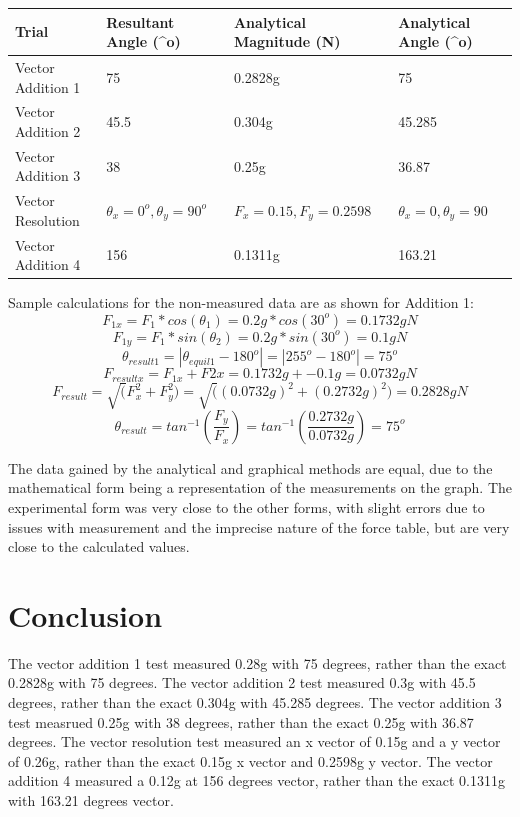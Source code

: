 \documentclass[11pt, titlepage]{article}
\begin{document}
\begin{center}
\begin{tabular}
{|m{7em}|m{7em}|m{7em}|m{7em}|}
\hline
Trial & Resultant Angle (^o) & Analytical Magnitude (N) & Analytical Angle (^o) \\ 
\hline
Vector Addition 1 & 75 & 0.2828g & 75 \\
\hline
Vector Addition 2 & 45.5 & 0.304g & 45.285 \\
\hline
Vector Addition 3 & 38 & 0.25g & 36.87 \\
\hline
Vector Resolution & $\theta_x = 0^o, \theta_y = 90^o$ & $F_x = 0.15, F_y = 0.2598$ & $\theta_x = 0, \theta_y = 90$ \\
\hline
Vector Addition 4 & 156 & 0.1311g & 163.21 \\
\hline
\end{tabular}
\end{center}

Sample calculations for the non-measured data are as shown for Addition 1:
$$F_{1x} = F_1*cos(\theta_1) = 0.2g*cos(30^o) = 0.1732g N$$
$$F_{1y} = F_1*sin(\theta_2) = 0.2g*sin(30^o) = 0.1g N$$
$$\theta_{result1} = |\theta_{equil1} - 180^o| = |255^o - 180^o| = 75^o$$
$$F_{resultx} = F_{1x} + F{2x} = 0.1732g + -0.1g = 0.0732g N$$
$$F_{result} = \sqrt(F_x^2 + F_y^2) = \sqrt((0.0732g)^2 + (0.2732g)^2) = 0.2828g N$$
$$\theta_{result} = tan^{-1}(\frac{F_y}{F_x}) = tan^{-1}(\frac{0.2732g}{0.0732g}) = 75^o$$

The data gained by the analytical and graphical methods are equal, due to the mathematical form being a representation of the measurements on the graph. The experimental form was very close to the other forms, with slight errors due to issues with measurement and the imprecise nature of the force table, but are very close to the calculated values.

\section*{Conclusion}
The vector addition 1 test measured 0.28g with 75 degrees, rather than the exact 0.2828g with 75 degrees. The vector addition 2 test measured 0.3g with 45.5 degrees, rather than the exact 0.304g with 45.285 degrees. The vector addition 3 test measrued 0.25g with 38 degrees, rather than the exact 0.25g with 36.87 degrees. The vector resolution test measured an x vector of 0.15g and a y vector of 0.26g, rather than the exact 0.15g x vector and 0.2598g y vector. The vector addition 4 measured a 0.12g at 156 degrees vector, rather than the exact 0.1311g with 163.21 degrees vector.  
\end{document}
